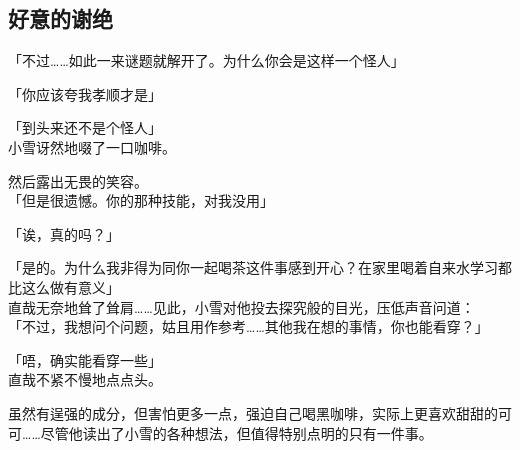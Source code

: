 \subsection{好意的谢绝}

「不过……如此一来谜题就解开了。为什么你会是这样一个怪人」

「你应该夸我孝顺才是」

「到头来还不是个怪人」\\

小雪讶然地啜了一口咖啡。

然后露出无畏的笑容。\\

「但是很遗憾。你的那种技能，对我没用」

「诶，真的吗？」

「是的。为什么我非得为同你一起喝茶这件事感到开心？在家里喝着自来水学习都比这么做有意义」\\

直哉无奈地耸了耸肩……见此，小雪对他投去探究般的目光，压低声音问道：\\

「不过，我想问个问题，姑且用作参考……其他我在想的事情，你也能看穿？」

「唔，确实能看穿一些」\\

直哉不紧不慢地点点头。

虽然有逞强的成分，但害怕更多一点，强迫自己喝黑咖啡，实际上更喜欢甜甜的可可……尽管他读出了小雪的各种想法，但值得特别点明的只有一件事。\\

